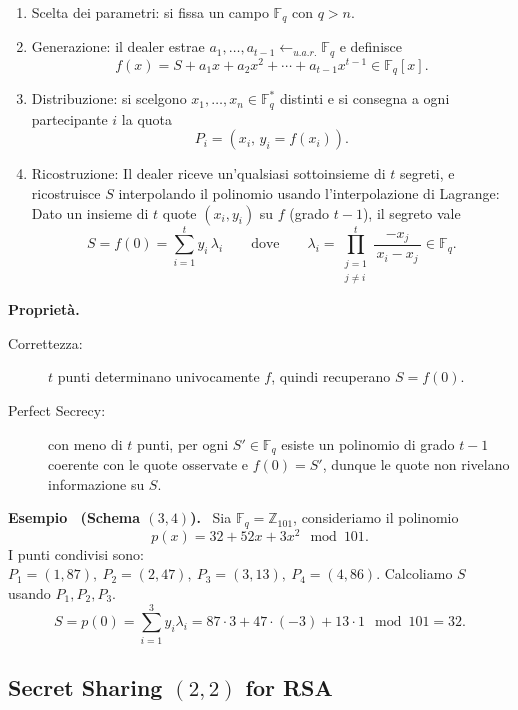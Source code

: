 \documentclass[a4paper, 11pt]{article}
\newenvironment{example}[1][]{
  \par\noindent\textbf{Esempio%
  \if\relax\detokenize{#1}\relax\else\ (\textbf{#1})\fi.}\ }{}
\begin{document}
\begin{enumerate}[itemsep=2pt, topsep=2pt]
    \item Scelta dei parametri: si fissa un campo $\mathbb{F}_q$ con $q>n$.
    \item Generazione: il dealer estrae $a_1,\dots,a_{t-1}\gets_{u.a.r.}\mathbb{F}_q$ e definisce
    \[
        f(x)=S+a_1x+a_2x^2+\cdots+a_{t-1}x^{t-1}\in\mathbb{F}_q[x].
    \]
    \item Distribuzione: si scelgono $x_1,\dots,x_n \in \mathbb{F}_q^*$ distinti e si consegna a ogni partecipante $i$ la quota
    \[
        P_i=(x_i,\,y_i=f(x_i)).
    \]
    \item Ricostruzione: Il dealer riceve un'qualsiasi sottoinsieme di $t$ segreti, e ricostruisce $S$ interpolando il polinomio usando l'interpolazione di Lagrange:
    Dato un insieme di $t$ quote $(x_i,y_i)$ su $f$ (grado $t-1$), il segreto vale
    \[
        S=f(0)=\sum_{i=1}^{t} y_i\,\lambda_i
        \qquad\text{dove}\qquad
        \lambda_i=\prod_{\substack{j=1\\ j\neq i}}^{t}\frac{-x_j}{\,x_i-x_j\,}\in\mathbb{F}_q.
    \]
\end{enumerate}

\textbf{Proprietà.}
\begin{description}
    \item [Correttezza:] $t$ punti determinano univocamente $f$, quindi recuperano $S=f(0)$.
    \item [Perfect Secrecy:] con meno di $t$ punti, per ogni $S'\in\mathbb{F}_q$ esiste un polinomio di grado $t\!-\!1$ coerente con le quote osservate e $f(0)=S'$, dunque le quote non rivelano informazione su $S$.
\end{description}

\begin{example}[Schema $(3, 4)$]
    Sia $\mathbb{F}_{q} = \mathbb{Z}_{101}$, consideriamo il polinomio
    \[
    p(x) = 32 + 52x + 3x^2 \mod 101.
    \]
    I punti condivisi sono: $P_1 = (1, 87),\ P_2 = (2, 47),\ P_3 = (3, 13),\ P_4 = (4, 86)$.
    Calcoliamo $S$ usando $P_1, P_2, P_3$.
    \[
        S = p(0) = \sum_{i=1}^3 y_i\lambda_i = 87 \cdot 3 + 47 \cdot(-3) + 13 \cdot 1 \mod 101 = 32.
    \]   
\end{example}

\subsection{Secret Sharing $(2, 2)$ for RSA}
\end{document}
